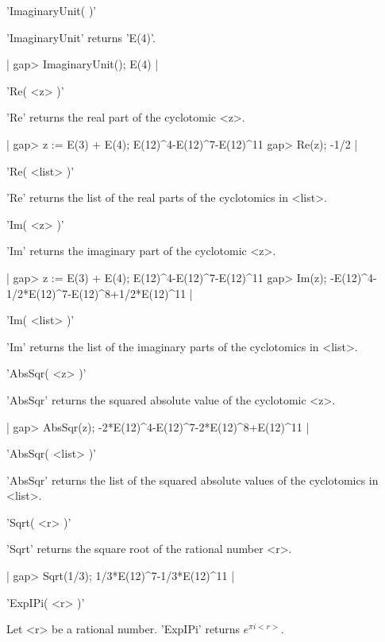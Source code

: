 'ImaginaryUnit( )'

'ImaginaryUnit' returns 'E(4)'.

|    gap> ImaginaryUnit();
    E(4) |


'Re( <z> )'

'Re' returns the real part of the cyclotomic <z>.

|    gap> z := E(3) + E(4);
    E(12)^4-E(12)^7-E(12)^11
    gap> Re(z);
    -1/2 |

'Re( <list> )'

'Re' returns the list of the real parts of the cyclotomics
in <list>.


'Im( <z> )'

'Im' returns the imaginary part of the cyclotomic <z>.

|    gap> z := E(3) + E(4);
    E(12)^4-E(12)^7-E(12)^11
    gap> Im(z);
    -E(12)^4-1/2*E(12)^7-E(12)^8+1/2*E(12)^11 |

'Im( <list> )'

'Im' returns the list of the imaginary parts of the cyclotomics
in <list>.


'AbsSqr( <z> )'

'AbsSqr' returns the squared absolute value of the cyclotomic <z>.

|    gap> AbsSqr(z);
    -2*E(12)^4-E(12)^7-2*E(12)^8+E(12)^11 |

'AbsSqr( <list> )'

'AbsSqr' returns the list of the squared absolute values 
of the cyclotomics in <list>.


'Sqrt( <r> )'

'Sqrt' returns the square root of the rational number <r>.

|    gap> Sqrt(1/3);
    1/3*E(12)^7-1/3*E(12)^11 |


'ExpIPi( <r> )'

Let <r> be a rational number. 'ExpIPi' returns $e^{\pi i <r>}$.

